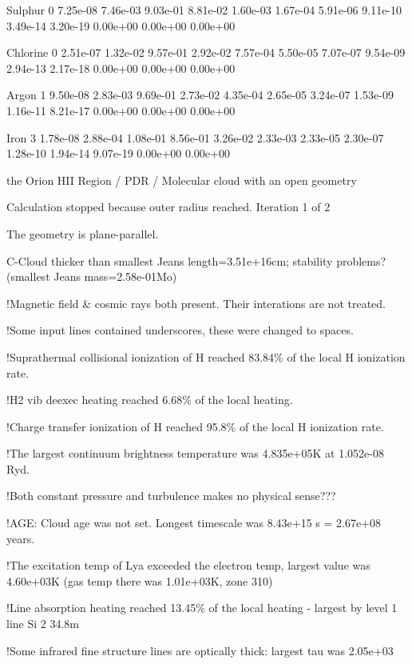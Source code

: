 { Sulphur    0  7.25e-08 7.46e-03 9.03e-01 8.81e-02 1.60e-03 1.67e-04 5.91e-06
9.11e-10 3.49e-14 3.20e-19 0.00e+00 0.00e+00 0.00e+00

 Chlorine   0  2.51e-07 1.32e-02 9.57e-01 2.92e-02 7.57e-04 5.50e-05 7.07e-07
9.54e-09 2.94e-13 2.17e-18 0.00e+00 0.00e+00 0.00e+00

 Argon      1  9.50e-08 2.83e-03 9.69e-01 2.73e-02 4.35e-04 2.65e-05 3.24e-07
1.53e-09 1.16e-11 8.21e-17 0.00e+00 0.00e+00 0.00e+00

 Iron       3  1.78e-08 2.88e-04 1.08e-01 8.56e-01 3.26e-02 2.33e-03 2.33e-05
2.30e-07 1.28e-10 1.94e-14 9.07e-19 0.00e+00 0.00e+00

 

    the Orion HII Region / PDR / Molecular cloud with an open geometry  

   Calculation stopped because outer radius reached. Iteration 1 of 2

 
   The geometry is plane-parallel.

 

 C-Cloud thicker than smallest Jeans length=3.51e+16cm; stability problems?
(smallest Jeans mass=2.58e-01Mo)

  !Magnetic field \& cosmic rays both present.  Their interations are not
treated.

  !Some input lines contained underscores, these were changed to spaces.

  !Suprathermal collisional ionization of H reached 83.84\% of the local
H ionization rate.

  !H2 vib deexec heating reached 6.68\% of the local heating.

  !Charge transfer ionization of H reached 95.8\% of the local H ionization
rate.

  !The largest continuum brightness temperature was 4.835e+05K at 1.052e-08
Ryd.

  !Both constant pressure and turbulence makes no physical sense???

  !AGE: Cloud age was not set.  Longest timescale was 8.43e+15 s = 2.67e+08
years.

  !The excitation temp of Lya exceeded the electron temp, largest value
was  4.60e+03K (gas temp there was  1.01e+03K, zone 310)

  !Line absorption heating reached 13.45\% of the local heating - largest
by level 1 line Si 2 34.8m

  !Some infrared fine structure lines are optically thick:  largest tau
was  2.05e+03

}
